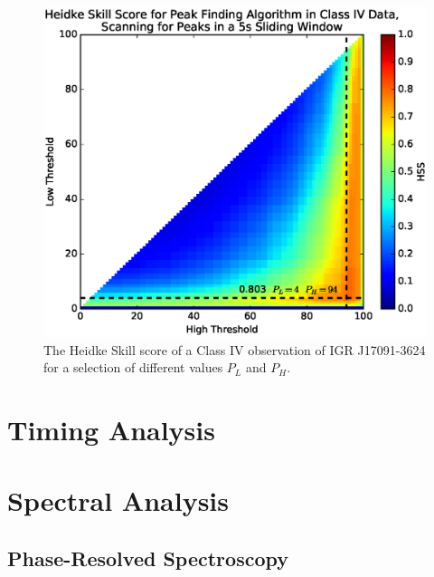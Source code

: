 \begin{figure}
    \includegraphics[width=\columnwidth, trim = 0mm 10mm 0mm 10mm]{images/HSS_J.eps}
    \captionsetup{singlelinecheck=off}
    \caption{The Heidke Skill score of a Class IV observation of IGR J17091-3624 for a selection of different values $P_L$ and $P_H$.}
   \label{fig:Heidke}
\end{figure}

\section{Timing Analysis}

\section{Spectral Analysis}

\subsection{Phase-Resolved Spectroscopy}
\label{sec:phasresspec}

